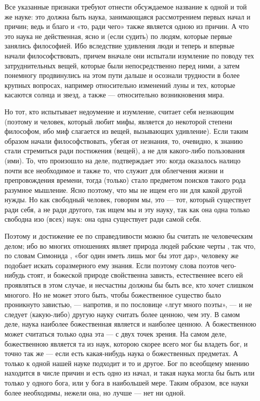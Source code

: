 \documentclass{article}
\begin{document}
Все указанные признаки требуют отнести обсуждаемое название к одной и той же науке: это должна быть наука, занимающаяся рассмотрением первых начал и причин; ведь и благо и «то, ради чего»
\footnotemark[7]
также является одною из причин. А что это наука не действенная, ясно и (если судить) по людям, которые первые занялись философией. Ибо вследствие удивления люди и теперь и впервые начали философствовать, причем вначале они испытали изумление по поводу тех затруднительных вещей, которые были непосредственно перед ними, а затем понемногу продвинулись на этом пути дальше и осознали трудности в более крупных вопросах, например относительно изменений
\footnotemark[8]
луны и тех, которые касаются солнца и звезд, а также — относительно возникновения мира.
\footnotemark[9]

Но тот, кто испытывает недоумение и изумление, считает себя незнающим (поэтому и человек, который любит мифы, является до некоторой степени философом, ибо миф слагается из вещей, вызывающих удивление). Если таким образом начали философствовать, убегая от незнания, то, очевидно, к знанию стали стремиться ради постижения (вещей), а не для какого-либо пользования (ими). То, что произошло на деле, подтверждает это: когда оказалось налицо почти все необходимое и также то, что служит для облегчения жизни и препровождения времени, тогда (только) стало предметом поисков такого рода разумное мышление. Ясно поэтому, что мы не ищем его ни для какой другой нужды. Но как свободный человек, говорим мы, это — тот, который существует ради себя, а не ради другого, так ищем мы и эту науку, так как она одна только свободна изо (всех) наук: она одна существует ради самой себя.

Поэтому и достижение ее по справедливости можно бы считать не человеческим делом; ибо во многих отношениях являет природа людей рабские черты
\footnotemark[10]
, так что, по словам Симонида
\footnotemark[11]
, «бог один иметь лишь мог бы этот дар», человеку же подобает искать соразмерного ему знания. Если поэтому слова поэтов чего-нибудь стоят, и божеской природе свойственна зависть, естественнее всего ей проявляться в этом случае, и несчастны должны бы быть все, кто хочет слишком многого. Но не может этого быть, чтобы божественное существо было проникнуто завистью, — напротив, и по пословице «лгут много поэты», — и не следует (какую-либо) другую науку считать более ценною, чем эту. В самом деле, наука наиболее божественная является и наиболее ценною. А божественною может считаться только одна эта — с двух точек зрения. На самом деле, божественною является та из наук, которою скорее всего мог бы владеть бог, и точно так же — если есть какая-нибудь наука о божественных предметах. А только к одной нашей науке подходит и то и другое. Бог по всеобщему мнению находится в числе причин и есть одно из начал, и такая наука могла бы быть или только у одного бога, или у бога в наибольшей мере. Таким образом, все науки более необходимы, нежели она, но лучше — нет ни одной.
\end{document}
